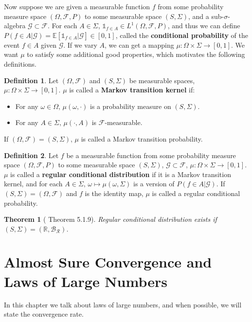 \documentclass[openany]{book}
\newtheorem{theorem}{Theorem}[chapter]
\theoremstyle{definition}
\newtheorem{definition}{Definition}[chapter]
\theoremstyle{remark}
\begin{document}
Now suppose we are given a measurable function $f$ from some probability measure space $(\Omega,\mathcal{F},P)$ to some measurable space $(S,\Sigma)$, and a sub-$\sigma$-algebra $\mathcal{G}\subset \mathcal{F}$. For each $A\in\Sigma$, $\mathds{1}_{f\in A}\in L^1(\Omega,\mathcal{F},P)$, and thus we can define $P(f\in A|\mathcal{G})=\mathbb{E}[\mathds{1}_{f\in A}|\mathcal{G}]\in[0,1]$, called the \textbf{conditional probability} of the event $f\in A$ given $\mathcal{G}$. If we vary $A$, we can get a mapping $\mu:\Omega\times\Sigma\to[0,1]$. We want $\mu$ to satisfy some additional good properties, which motivates the following definitions.
\begin{definition}
    Let $(\Omega,\mathcal{F})$ and $(S,\Sigma)$ be measurable spaces, $\mu:\Omega\times\Sigma\to[0,1]$.  $\mu$ is called a \textbf{Markov transition kernel} if:
    \begin{itemize}
        \item For any $\omega\in\Omega$, $\mu(\omega,\cdot)$ is a probability measure on $(S,\Sigma)$.
        \item For any $A\in\Sigma$, $\mu(\cdot,A)$ is $\mathcal{F}$-measurable.
    \end{itemize}
    If $(\Omega,\mathcal{F})=(S,\Sigma)$, $\mu$ is called a Markov transition probability.
\end{definition}
\begin{definition}
    Let $f$ be a measurable function from some probability measure space $(\Omega,\mathcal{F},P)$ to some measurable space $(S,\Sigma)$, $\mathcal{G}\subset \mathcal{F}$, $\mu:\Omega\times\Sigma\to[0,1]$. $\mu$ is called a \textbf{regular conditional distribution} if it is a Markov transition kernel, and for each $A\in\Sigma$, $\omega\mapsto\mu(\omega,\Sigma)$ is a version of $P(f\in A|\mathcal{G})$.
    If $(S,\Sigma)=(\Omega,\mathcal{F})$ and $f$ is the identity map, $\mu$ is called a regular conditional probability.
\end{definition}
\begin{theorem}[\cite{D10} Theorem 5.1.9]
    Regular conditional distribution exists if $(S,\Sigma)=(\mathbb{R},\mathcal{B}_{\mathcal{R}})$.
\end{theorem}

\chapter{Almost Sure Convergence and Laws of Large Numbers}\label{chp:LLN}
In this chapter we talk about laws of large numbers, and when possible, we will state the convergence rate.
\end{document}
